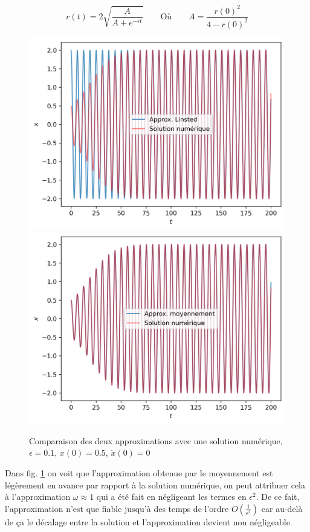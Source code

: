 %
\begin{equation}
    r(t) = 2 \sqrt{ \frac{A}{A + e^{-\epsilon t}} }
    \qquad
    \text{Où}
    \qquad 
    A = \frac{r(0)^2}{4 - r(0)^2}
\end{equation}
%
\begin{figure}
    \centering
    \begin{subcaptionblock}{.90\linewidth}
        \includegraphics[width=.5\linewidth]{images/vdp/vdp_approx_linsted.png}%
        \hfill
        \includegraphics[width=.5\linewidth]{images/vdp/vdp_approx_transient.png}%
    \end{subcaptionblock}
    \caption{Comparaison des deux approximations avec une solution numérique, $\epsilon=0.1$, $x(0)=0.5$, $\dot{x}(0)=0$}
    \label{fig:vdp_approx}
\end{figure}
%
Dans {fig. \ref{fig:vdp_approx}} on voit que l'approximation obtenue par le moyennement est légèrement en avance par rapport à la solution numérique, on peut attribuer cela à l'approximation $\omega \approx 1$ qui a été fait en négligeant les termes en $\epsilon^2$. 
De ce fait, l'approximation n'est que fiable jusqu'à des temps de l'ordre $O\left( \frac{1}{\epsilon^2} \right)$ car au-delà de ça le décalage entre la solution et l'approximation devient non négligeable.